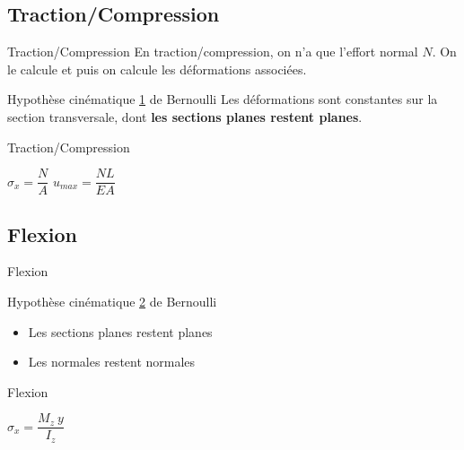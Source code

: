\documentclass[10pt]{beamer}
\begin{document}
\subsection{Traction/Compression}
\begin{frame}{Traction/Compression}
En traction/compression, on n'a que l'effort normal $N$. On le calcule et puis on calcule les déformations associées.
\begin{block}{Hypothèse cinématique \underline{1} de Bernoulli}
Les déformations sont constantes sur la section transversale, dont \textbf{les sections planes restent planes}.
\end{block}


\begin{alertblock}{Traction/Compression}
\begin{center}
$\boxed{\sigma_x = \dfrac{N}{A}}$ $\boxed{u_{max} = \dfrac{NL}{EA}}$
\end{center}
\end{alertblock} 
\end{frame}
\subsection{Flexion}
\begin{frame}{Flexion}
\begin{block}{Hypothèse cinématique \underline{2} de Bernoulli}
\begin{itemize}
\item Les sections planes restent planes
\item Les normales restent normales
\end{itemize}
\end{block}

\begin{alertblock}{Flexion}
\begin{center}
$\boxed{\sigma_x = \dfrac{M_z \ y}{I_z}}$
\end{center}
\end{alertblock}
\end{frame}
\end{document}
